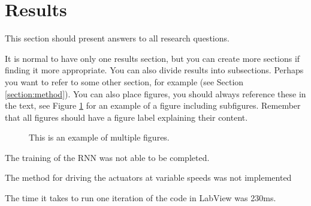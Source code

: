 \section{Results}
\label{section:results}
This section should present answers to all research questions.

It is normal to have only one results section, but you can create more sections if finding it more appropriate. You can
also divide results into subsections. Perhaps you want to refer to some other section, for example (see Section \ref{section:method}).
You can also place figures, you should always reference these in the text, see Figure \ref{fig:MDHlogga} for an example of a figure
including subfigures. Remember that all figures should have a figure label explaining their content.


\begin{figure}[H]
    \centering
    \qquad
    \qquad
    \caption[Short text]{This is an example of multiple figures.}
    \label{fig:MDHlogga}
\end{figure}




The training of the RNN was not able to be completed.

The method for driving the actuators at variable speeds was not implemented

The time it takes to run one iteration of the code in LabView was 230ms.